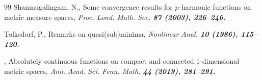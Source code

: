 \documentclass[a4paper,twoside]{article}
\newcommand{\art}[6]{{\sc #1, \rm #2, \it #3 \bf #4 \rm (#5), \mbox{#6}.}}
\newcommand{\auth}[2]{{#1, #2.}}
\theoremstyle{propositional}
\theoremstyle{descriptive}
\theoremstyle{remarkstyle}
\newcommand{\p}{{$p\mspace{1mu}$}}
\numberwithin{equation}{section}
\begin{document}
\begin{thebibliography}{99}
 \art{Shanmugalingam, N.}
        {Some convergence results for \p-harmonic functions on metric
        measure spaces}
        {Proc. Lond. Math. Soc.} {87} {2003} {226--246}

 \art{Tolksdorf, P.}
         {Remarks on quasi(sub)minima}
         {Nonlinear Anal.} {10} {1986} {115--120}

 \art{\auth{Zhou}{X}}
        {Absolutely continuous functions on compact and connected $1$-dimensional metric spaces}
        {Ann. Acad. Sci. Fenn. Math.} {44}{2019}{281--291}

\end{thebibliography}
\end{document}
